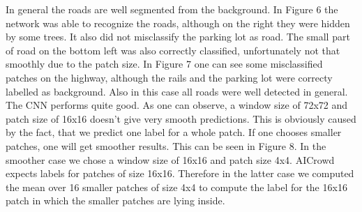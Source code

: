 \documentclass[10pt,conference,compsocconf]{IEEEtran}
\begin{document}
In general the roads are well segmented from the background. In Figure 6 the network was able to recognize the roads, although on the right they were hidden by some trees. It also did not misclassify the parking lot as road. The small part of road on the bottom left was also correctly classified, unfortunately not that smoothly due to the patch size. In Figure 7 one can see some misclassified patches on the highway, although the rails and the parking lot were correcty labelled as background. Also in this case all roads were well detected in general. The CNN performs quite good. As one can observe, a window size of 72x72 and patch size of 16x16 doesn't give very smooth predictions. This is obviously caused by the fact, that we predict one label for a whole patch. If one chooses smaller patches, one will get smoother results. This can be seen in Figure 8. In the smoother case we chose a window size of 16x16 and patch size 4x4. AICrowd expects labels for patches of size 16x16. Therefore in the latter case we computed the mean over 16 smaller patches of size 4x4 to compute the label for the 16x16 patch in which the smaller patches are lying inside. 
\end{document}
